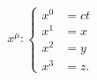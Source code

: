 \documentclass[preview]{standalone}
\begin{document}
\begin{align*}
x^\mu : \begin{cases} x^0 &= ct \\ x^1 &= x \\ x^2 &= y \\ x^3 &=z. \end{cases}
\end{align*}
\end{document}
